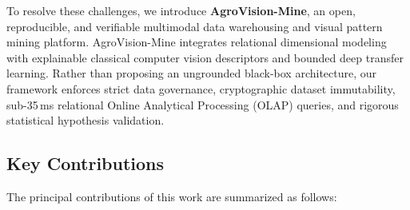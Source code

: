 \documentclass[conference]{IEEEtran}
\begin{document}
To resolve these challenges, we introduce \textbf{AgroVision-Mine}, an open, reproducible, and verifiable multimodal data warehousing and visual pattern mining platform. AgroVision-Mine integrates relational dimensional modeling with explainable classical computer vision descriptors and bounded deep transfer learning. Rather than proposing an ungrounded black-box architecture, our framework enforces strict data governance, cryptographic dataset immutability, sub-35\,ms relational Online Analytical Processing (OLAP) queries, and rigorous statistical hypothesis validation.

\subsection{Key Contributions}
The principal contributions of this work are summarized as follows:
\end{document}
